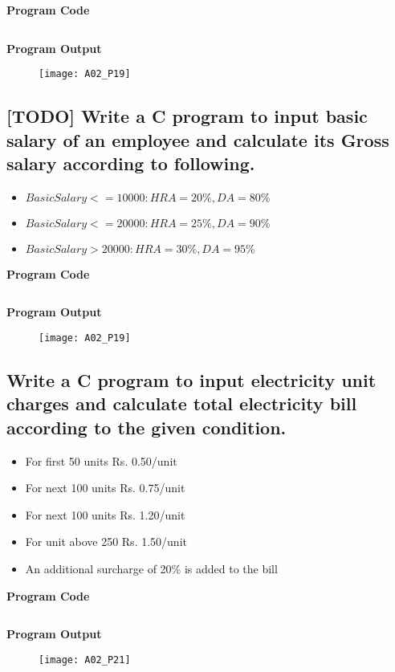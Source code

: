 \textbf{Program Code}
\inputminted[breaklines]{C}{programs/A02_P19.c}
\textbf{Program Output}
\begin{figure}[h]
  \texttt{[image: A02\_P19]}
\end{figure}
\pagebreak

\subsection{[TODO] Write a C program to input basic salary of an employee and calculate its Gross salary according to following.}
\begin{itemize}
  \item $Basic Salary <= 10000 : HRA = 20\%, DA = 80\%$
  \item $Basic Salary <= 20000 : HRA = 25\%, DA = 90\%$
  \item $Basic Salary > 20000 : HRA = 30\%, DA = 95\%$
\end{itemize}
\textbf{Program Code}
\inputminted[breaklines]{C}{programs/A02_P19.c}
\textbf{Program Output}
\begin{figure}[h]
  \texttt{[image: A02\_P19]}
\end{figure}
\pagebreak


\subsection{Write a C program to input electricity unit charges and calculate total electricity bill according to the given condition.}
\begin{itemize}
  \item For first 50 units Rs. 0.50/unit
  \item For next 100 units Rs. 0.75/unit
  \item For next 100 units Rs. 1.20/unit
  \item For unit above 250 Rs. 1.50/unit
  \item An additional surcharge of 20\% is added to the bill
\end{itemize}
\textbf{Program Code}
\inputminted[breaklines]{C}{programs/A02_P21.c}
\textbf{Program Output}
\begin{figure}[h]
  \texttt{[image: A02\_P21]}
\end{figure}
\pagebreak
